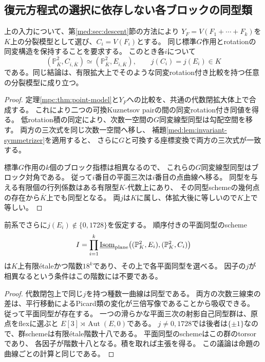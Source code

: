 \subsection{復元方程式の選択に依存しない各ブロックの同型類}

\begin{corollary}[任意の同変復元ブロックの$j$]
\label{mpc:cor:block-j}
上の入力について、第\ref{med:sec:descent}節の方法により
$Y_F=V(F_1+\cdots+F_k)$を$K$上の分裂模型として選び、$C_i=V(F_i)$とする。
同じ標準$G$作用とrotationの同変構造を保持することを要求する。
このとき各$i$について
\begin{equation}\label{mpc:eq:block-j}
 (\mathbb P^2_{\overline K},C_{i,\overline K})
 \simeq(\mathbb P^2_{\overline K},E_{i,\overline K}),
 \qquad j(C_i)=j(E_i)\in K
\end{equation}
である。同じ結論は、有限拡大上でそのような同変rotation付き比較を持つ任意の分裂模型に成り立つ。
\end{corollary}
\begin{proof}
定理\ref{mpc:thm:point-model}と$Y_F$への比較を、共通の代数閉拡大体上で合成する。
これにより二つの可換Kuznetsov pairの間の同変rotation付き同値を得る。
低rotation積の同定により、次数一空間の$G$同変線型同型は勾配空間を移す。
両方の三次式を同じ次数一空間へ移し、
補題\ref{med:lem:invariant-symmetrizer}を適用すると、
さらに$G$と可換する座標変換で両方の三次式が一致する。

標準$G$作用の$k$個のブロック指標は相異なるので、
これらの$G$同変線型同型はブロック対角である。
従って$i$番目の平面三次は$i$番目の点曲線へ移る。
同型を与える有限個の行列係数はある有限型$K$-代数上にあり、
その同型schemeの幾何点の存在から$\overline K$上でも同型となる。
両$j$は$K$に属し、体拡大後に等しいので$K$上で等しい。
\end{proof}

\begin{corollary}[順序付き平面同型の有限被覆]
\label{mpc:cor:plane-isom-cover}
前系でさらに$j(E_i)\notin\{0,1728\}$を仮定する。
順序付きの平面同型のscheme
\[
 I=\prod_{i=1}^k
 \underline{\operatorname{Isom}}_{\rm plane}
 \bigl((\mathbb P^2_K,E_i),(\mathbb P^2_K,C_i)\bigr)
\]
は$K$上有限\'etaleかつ階数$18^k$であり、その上で各平面同型を選べる。
因子の$j$が相異なるという条件はこの階数には不要である。
\end{corollary}
\begin{proof}
代数閉包上で同じ$j$を持つ種数一曲線は同型である。
両方の次数三線束の差は、平行移動によるPicard類の変化が三倍写像であることから吸収できる。
従って平面同型が存在する。
一つの滑らかな平面三次の射影自己同型群は、原点をflexに選ぶと
$E[3]\rtimes\operatorname{Aut}(E,0)$である。
$j\ne0,1728$では後者は$\{\pm1\}$なので、群schemeは有限\'etale階数十八である。
平面同型のschemeはこの群のtorsorであり、
各因子が階数十八となる。積を取れば主張を得る。
この議論は命題の曲線ごとの計算と同じである。
\end{proof}

